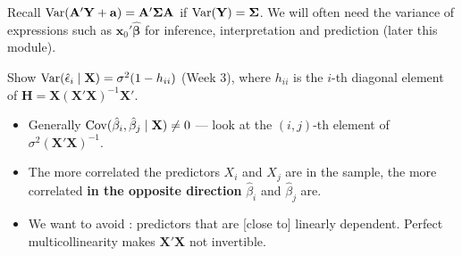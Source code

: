 \begin{remark}
    Recall $\operatorname{Var}(\mathbf{A}'\mathbf{Y}+\mathbf{a})=\mathbf{A}'\boldsymbol\Sigma\mathbf{A}$ if
    $\operatorname{Var}(\mathbf{Y})=\boldsymbol\Sigma$. We will often need the variance of expressions
    such as $\mathbf{x}_0'\hat{\boldsymbol\beta}$ for inference, interpretation and
    prediction (later this module).
\end{remark}

\begin{exercise}
    Show $\operatorname{Var}(\hat\epsilon_i\mid\mathbf{X})=\sigma^2(1-h_{ii})$ (Week 3), where $h_{ii}$
    is the $i$-th diagonal element of $\mathbf{H}=\mathbf{X}(\mathbf{X}'\mathbf{X})^{-1}\mathbf{X}'$.
    \\
\end{exercise}

\begin{itemize}
    \item Generally $\operatorname{Cov}(\hat\beta_i,\hat\beta_j\mid\mathbf{X})\neq0$ --- look at the
    $(i,j)$-th element of $\sigma^2(\mathbf{X}'\mathbf{X})^{-1}$.
    \item The more correlated the predictors $X_i$ and $X_j$ are in the sample, the
    more correlated \textbf{in the opposite direction} $\hat\beta_i$ and $\hat\beta_j$ are.
    \item We want to avoid : predictors that are
    [close to] linearly dependent. Perfect multicollinearity makes
    $\mathbf{X}'\mathbf{X}$ not invertible.
\end{itemize}


